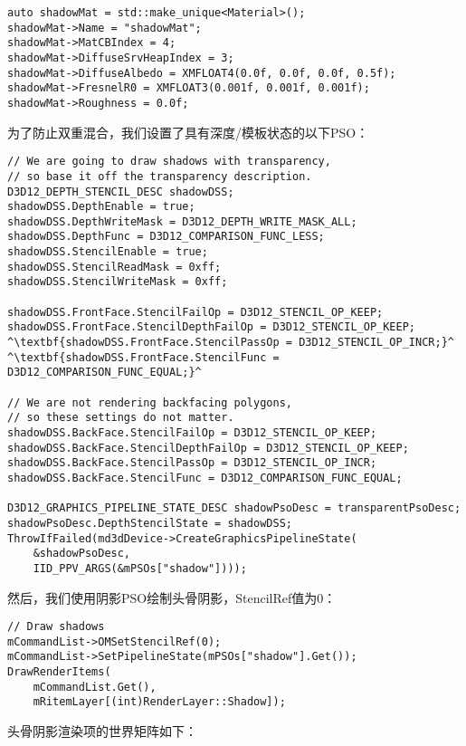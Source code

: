 \begin{lstlisting}
auto shadowMat = std::make_unique<Material>();
shadowMat->Name = "shadowMat";
shadowMat->MatCBIndex = 4;
shadowMat->DiffuseSrvHeapIndex = 3;
shadowMat->DiffuseAlbedo = XMFLOAT4(0.0f, 0.0f, 0.0f, 0.5f);
shadowMat->FresnelR0 = XMFLOAT3(0.001f, 0.001f, 0.001f);
shadowMat->Roughness = 0.0f;
\end{lstlisting}

\begin{flushleft}
为了防止双重混合，我们设置了具有深度/模板状态的以下PSO：\\
\end{flushleft}

\begin{lstlisting}[escapechar=^]
// We are going to draw shadows with transparency, 
// so base it off the transparency description.
D3D12_DEPTH_STENCIL_DESC shadowDSS;
shadowDSS.DepthEnable = true;
shadowDSS.DepthWriteMask = D3D12_DEPTH_WRITE_MASK_ALL;
shadowDSS.DepthFunc = D3D12_COMPARISON_FUNC_LESS;
shadowDSS.StencilEnable = true;
shadowDSS.StencilReadMask = 0xff;
shadowDSS.StencilWriteMask = 0xff;

shadowDSS.FrontFace.StencilFailOp = D3D12_STENCIL_OP_KEEP;
shadowDSS.FrontFace.StencilDepthFailOp = D3D12_STENCIL_OP_KEEP;
^\textbf{shadowDSS.FrontFace.StencilPassOp = D3D12_STENCIL_OP_INCR;}^
^\textbf{shadowDSS.FrontFace.StencilFunc = D3D12_COMPARISON_FUNC_EQUAL;}^

// We are not rendering backfacing polygons, 
// so these settings do not matter.
shadowDSS.BackFace.StencilFailOp = D3D12_STENCIL_OP_KEEP;
shadowDSS.BackFace.StencilDepthFailOp = D3D12_STENCIL_OP_KEEP;
shadowDSS.BackFace.StencilPassOp = D3D12_STENCIL_OP_INCR;
shadowDSS.BackFace.StencilFunc = D3D12_COMPARISON_FUNC_EQUAL;

D3D12_GRAPHICS_PIPELINE_STATE_DESC shadowPsoDesc = transparentPsoDesc;
shadowPsoDesc.DepthStencilState = shadowDSS;
ThrowIfFailed(md3dDevice->CreateGraphicsPipelineState(
    &shadowPsoDesc, 
    IID_PPV_ARGS(&mPSOs["shadow"])));
\end{lstlisting}

\begin{flushleft}
然后，我们使用阴影PSO绘制头骨阴影，StencilRef值为0：\\
\end{flushleft}

\begin{lstlisting}
// Draw shadows
mCommandList->OMSetStencilRef(0);
mCommandList->SetPipelineState(mPSOs["shadow"].Get());
DrawRenderItems(
    mCommandList.Get(),
    mRitemLayer[(int)RenderLayer::Shadow]);
\end{lstlisting}
\begin{flushleft}
头骨阴影渲染项的世界矩阵如下：\\
\end{flushleft}

